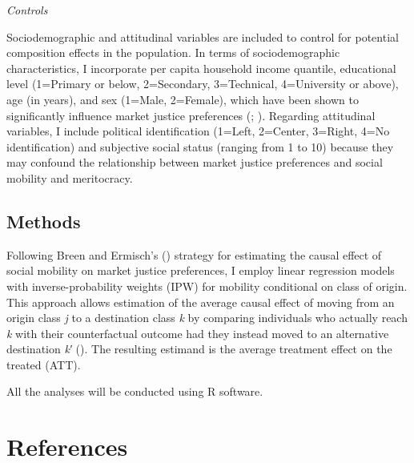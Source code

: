 \documentclass[
  13pt,
]{article}
\begin{document}
\emph{Controls}

Sociodemographic and attitudinal variables are included to control for
potential composition effects in the population. In terms of
sociodemographic characteristics, I incorporate per capita household
income quantile, educational level (1=Primary or below, 2=Secondary,
3=Technical, 4=University or above), age (in years), and sex (1=Male,
2=Female), which have been shown to significantly influence market
justice preferences (; ). Regarding
attitudinal variables, I include political identification (1=Left,
2=Center, 3=Right, 4=No identification) and subjective social status
(ranging from 1 to 10) because they may confound the relationship
between market justice preferences and social mobility and meritocracy.

\subsection{Methods}\label{methods}

Following Breen and Ermisch's ()
strategy for estimating the causal effect of social mobility on market
justice preferences, I employ linear regression models with
inverse-probability weights (IPW) for mobility conditional on class of
origin. This approach allows estimation of the average causal effect of
moving from an origin class \emph{j} to a destination class \emph{k} by
comparing individuals who actually reach \emph{k} with their
counterfactual outcome had they instead moved to an alternative
destination \emph{k′} (). The resulting estimand is the average treatment effect
on the treated (ATT).

All the analyses will be conducted using R software.

\section{References}\label{references}
\end{document}
